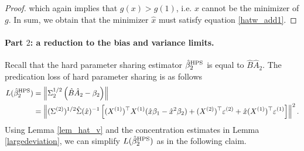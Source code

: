 \begin{proof}
which again implies that $g(x)>g(1)$, i.e. $x$ cannot be the minimizer of $g$. In sum, we obtain that the minimizer $\hat x$ must satisfy equation \eqref{hatw_add1}.
%
\end{proof}

\paragraph{Part $2$: a reduction to the bias and variance limits.}
Recall that the hard parameter sharing estimator $\hat{\beta}_2^{\textup{HPS}}$ is equal to $\hat{B} \hat{A}_2$.
The predication loss of hard parameter sharing is as follows
\begin{align}
L(\hat{\beta}_2^{\textup{HPS}}) &=\left\|\Sigma_2^{1/2} \left( \hat B \hat A_2 - \beta_2\right)\right\| \nonumber\\
&=  \left\| (\Sigma^{(2)})^{1/2}\hat \Sigma(\hat x)^{-1} \left[(X^{(1)})^\top X^{(1)} (\hat x\beta_1-\hat x^2\beta_2)+ (X^{(2)})^\top \varepsilon^{(2)} + \hat x   (X^{(1)})^\top \varepsilon^{(1)} \right]\right\|^2.\label{Lbeta_HPS}
\end{align}
Using Lemma \ref{lem_hat_v} and the concentration estimates in Lemma \ref{largedeviation}, we can simplify $L(\hat{\beta}_2^{\textup{HPS}})$ as in the following claim.

